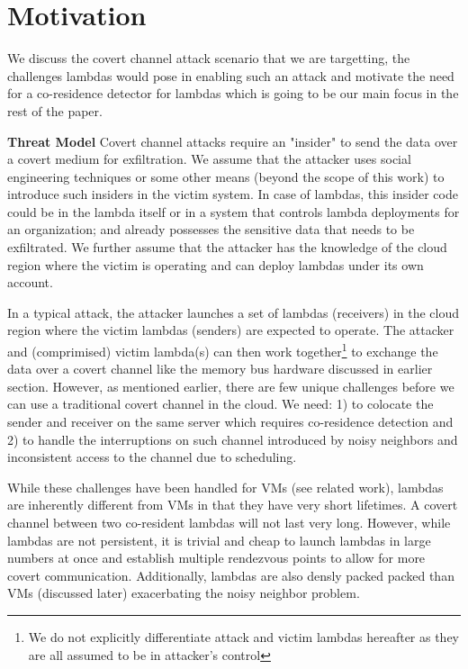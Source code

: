 
\section{Motivation}
\label{sec:motivation}

We discuss the covert channel attack scenario that we are targetting, the challenges 
lambdas would pose in enabling such an attack and motivate the need for a 
co-residence detector for lambdas which is going to be our main focus in the rest of 
the paper. 

\textbf{Threat Model}
Covert channel attacks require an "insider" to send the data over a covert 
medium for exfiltration. We assume that the attacker uses social engineering 
techniques or some other means (beyond the scope of this work) to introduce  
such insiders in the victim system. In case of lambdas, this insider code could be 
in the lambda itself or in a system that controls lambda deployments for an 
organization; and already possesses the sensitive data that needs to be exfiltrated. 
We further assume that the attacker has the knowledge of the cloud region 
where the victim is operating and can deploy lambdas under its own account.

In a typical attack, the attacker launches a set of  lambdas (receivers) in the 
cloud region where the victim lambdas 
(senders) are expected to operate. The attacker and 
(comprimised) victim lambda(s) can then work together\footnote{We do not explicitly
differentiate attack and victim lambdas hereafter as they are all assumed 
to be in attacker's control} to exchange the data over 
a covert channel like the memory bus hardware discussed in earlier section.
However, as mentioned earlier, there are few unique challenges before we can use
a traditional covert channel in the cloud. We need: 1) to colocate the sender 
and receiver on the same server which requires co-residence detection and 2) to handle
the interruptions on such channel introduced by noisy neighbors and inconsistent 
access to the channel due to scheduling.

While these challenges have been handled for VMs (see related work), lambdas are
inherently different from VMs in that they have very short lifetimes. A covert
channel between two co-resident lambdas will not last very long. However, while
lambdas are not persistent, it is trivial and cheap to launch lambdas in large numbers at
once and establish multiple rendezvous points to allow for more covert communication.
Additionally, lambdas are also densly packed packed than VMs (discussed later) 
exacerbating the noisy neighbor problem.

